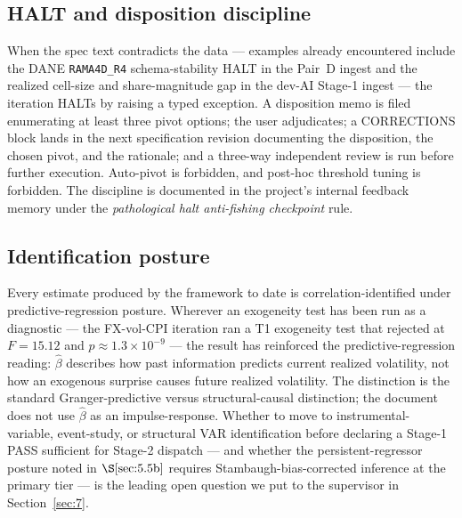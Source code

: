 \subsection{HALT and disposition discipline}\label{sec:5.7}

When the spec text contradicts the data --- examples already encountered
include the DANE \texttt{RAMA4D\_R4} schema-stability HALT in the Pair~D
ingest and the realized cell-size and share-magnitude gap in the dev-AI
Stage-1 ingest --- the iteration HALTs by raising a typed exception. A
disposition memo is filed enumerating at least three pivot options; the
user adjudicates; a CORRECTIONS block lands in the next specification
revision documenting the disposition, the chosen pivot, and the
rationale; and a three-way independent review is run before further
execution. Auto-pivot is forbidden, and post-hoc threshold tuning is
forbidden. The discipline is documented in the project's internal
feedback memory under the \emph{pathological halt anti-fishing
checkpoint} rule.

\subsection{Identification posture}\label{sec:5.8}

Every estimate produced by the framework to date is correlation-identified
under predictive-regression posture. Wherever an exogeneity test has been
run as a diagnostic --- the FX-vol-CPI iteration ran a T1 exogeneity test
that rejected at \(F = 15.12\) and \(p \approx 1.3 \times 10^{-9}\) --- the
result has reinforced the predictive-regression reading: \(\hat{\beta}\)
describes how past information predicts current realized volatility, not
how an exogenous surprise causes future realized volatility. The
distinction is the standard Granger-predictive versus structural-causal
distinction; the document does not use \(\hat{\beta}\) as an
impulse-response. Whether to move to instrumental-variable, event-study,
or structural VAR identification before declaring a Stage-1 PASS
sufficient for Stage-2 dispatch --- and whether the persistent-regressor
posture noted in \(\S\ref{sec:5.5b}\) requires Stambaugh-bias-corrected
inference at the primary tier --- is the leading open question we put to
the supervisor in Section~\ref{sec:7}.

